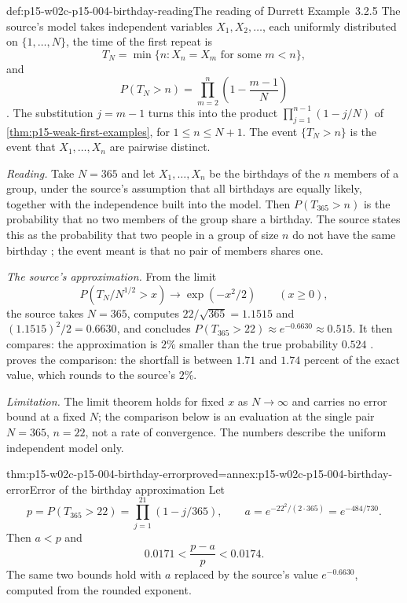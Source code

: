 \begin{hbexample}{def:p15-w02c-p15-004-birthday-reading}{The reading of Durrett Example~3.2.5}
The source's model takes independent variables \(X_1,X_2,\ldots\),
each uniformly distributed on \(\{1,\ldots,N\}\), the time of the first repeat is
\[
 T_N=\min\{n:X_n=X_m\text{ for some }m<n\},
\]
and
\[
 P(T_N>n)=\prod_{m=2}^{n}\left(1-\frac{m-1}{N}\right)
\]
\cite[Example~3.2.5, p.~117]{DurrettPTEAuthor2019}. The substitution
\(j=m-1\) turns this into the product
\(\prod_{j=1}^{n-1}(1-j/N)\) of \cref{thm:p15-weak-first-examples}, for
\(1\leq n\leq N+1\). The event \(\{T_N>n\}\) is the event that
\(X_1,\ldots,X_n\) are pairwise distinct.

\emph{Reading.} Take \(N=365\) and let \(X_1,\ldots,X_n\) be the
birthdays of the \(n\) members of a group, under the source's
assumption that all birthdays are equally likely, together with the
independence built into the model. Then \(P(T_{365}>n)\) is the
probability that no two members of the group share a birthday. The
source states this as the probability that two people in a group of
size \(n\) do not have the same birthday \cite[p.~117]{DurrettPTEAuthor2019};
the event meant is that no pair of members shares one.

\emph{The source's approximation.} From the limit
\[
 P(T_N/N^{1/2}>x)\to\exp(-x^2/2)\qquad(x\geq0),
\]
the source takes \(N=365\), computes \(22/\sqrt{365}=1.1515\) and
\((1.1515)^2/2=0.6630\), and concludes \(P(T_{365}>22)\approx
e^{-0.6630}\approx0.515\). It then compares: the approximation is
\(2\%\) smaller than the true probability \(0.524\)
\cite[p.~117]{DurrettPTEAuthor2019}. 
proves the comparison: the shortfall is between \(1.71\) and \(1.74\)
percent of the exact value, which rounds to the source's \(2\%\).

\emph{Limitation.} The limit theorem holds for fixed \(x\) as
\(N\to\infty\) and carries no error bound at a fixed \(N\); the
comparison below is an evaluation at the single pair \(N=365\),
\(n=22\), not a rate of convergence. The numbers describe the uniform
independent model only.
\end{hbexample}

\begin{hbtheorem}{thm:p15-w02c-p15-004-birthday-error}{proved=annex:p15-w02c-p15-004-birthday-error}{Error of the birthday approximation}
Let
\[
 p=P(T_{365}>22)=\prod_{j=1}^{21}(1-j/365),\qquad
 a=e^{-22^2/(2\cdot365)}=e^{-484/730}.
\]
Then \(a<p\) and
\[
 0.0171<\frac{p-a}{p}<0.0174 .
\]
The same two bounds hold with \(a\) replaced by the source's value
\(e^{-0.6630}\), computed from the rounded exponent.
\end{hbtheorem}

